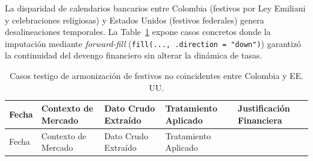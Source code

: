 \documentclass[
  10pt,
  letterpaper,
  DIV=11,
  numbers=noendperiod]{scrartcl}
\begin{document}
La disparidad de calendarios bancarios entre Colombia (festivos por Ley
Emiliani y celebraciones religiosas) y Estados Unidos (festivos
federales) genera desalineaciones temporales. La
Table~\ref{tbl-evidencia-festivos} expone casos concretos donde la
imputación mediante \emph{forward-fill}
(\texttt{fill(...,\ .direction\ =\ "down")}) garantizó la continuidad
del devengo financiero sin alterar la dinámica de tasas.

\begin{longtable}[]{@{}
  >{\centering\arraybackslash}p{}
  >{\raggedright\arraybackslash}p{}
  >{\raggedright\arraybackslash}p{}
  >{\raggedright\arraybackslash}p{}
  >{\raggedright\arraybackslash}p{}@{}}
\caption{Casos testigo de armonización de festivos no coincidentes entre
Colombia y EE. UU.}\label{tbl-evidencia-festivos}\tabularnewline
\toprule\noalign{}
\begin{minipage}[b]{\linewidth}\centering
Fecha
\end{minipage} & \begin{minipage}[b]{\linewidth}\raggedright
Contexto de Mercado
\end{minipage} & \begin{minipage}[b]{\linewidth}\raggedright
Dato Crudo Extraído
\end{minipage} & \begin{minipage}[b]{\linewidth}\raggedright
Tratamiento Aplicado
\end{minipage} & \begin{minipage}[b]{\linewidth}\raggedright
Justificación Financiera
\end{minipage} \\
\midrule\noalign{}
\endfirsthead
\toprule\noalign{}
\begin{minipage}[b]{\linewidth}\centering
Fecha
\end{minipage} & \begin{minipage}[b]{\linewidth}\raggedright
Contexto de Mercado
\end{minipage} & \begin{minipage}[b]{\linewidth}\raggedright
Dato Crudo Extraído
\end{minipage} & \begin{minipage}[b]{\linewidth}\raggedright
Tratamiento Aplicado
\end{minipage} & \begin{minipage}[b]{\linewidth}\raggedright

\end{minipage}
\end{longtable}
\end{document}
